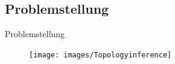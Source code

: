\documentclass[ngerman,compress,hyperref={bookmarks}]{beamer}
\begin{document}
\subsection{Problemstellung}
\begin{frame}{Problemstellung}
  \begin{figure}
    \texttt{[image: images/Topologyinference]}
  \end{figure}
\end{frame}


\end{document}
